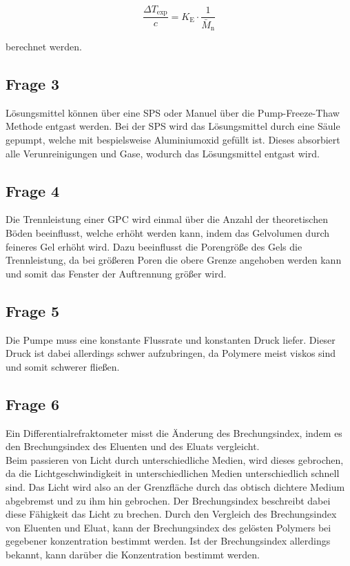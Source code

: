 \documentclass[10pt,a4paper,ngerman]{scrartcl}
\begin{document}
		\begin{equation}
			\frac{\Delta T_\text{exp}}{c} = K_\text{E} \cdot \frac{1}{\bar{M}_\text{n}}
		\end{equation}

		berechnet werden. \cite{Ludwigs2025}
	\subsection{Frage 3}

		Lösungsmittel können über eine SPS oder Manuel über die Pump-Freeze-Thaw Methode entgast werden. Bei der SPS wird das 
		Lösungsmittel durch eine Säule gepumpt, welche mit bespielsweise Aluminiumoxid gefüllt ist. Dieses absorbiert alle Verunreinigungen und 
		Gase, wodurch das Lösungsmittel entgast wird. 

	\subsection{Frage 4}

		Die Trennleistung einer GPC wird einmal über die Anzahl der theoretischen Böden beeinflusst, welche erhöht werden kann, indem das 
		Gelvolumen durch feineres Gel erhöht wird. Dazu beeinflusst die Porengröße des Gels die Trennleistung, da bei größeren Poren die obere 
		Grenze angehoben werden kann und somit das Fenster der Auftrennung größer wird. \cite{polyskript}

	\subsection{Frage 5}

		Die Pumpe muss eine konstante Flussrate und konstanten Druck liefer. Dieser Druck ist dabei allerdings schwer aufzubringen, da Polymere 
		meist viskos sind und somit schwerer fließen. \cite{polyskript}

	\subsection{Frage 6}

		Ein Differentialrefraktometer misst die Änderung des Brechungsindex, indem es den Brechungsindex des Eluenten und des Eluats vergleicht. \\
		Beim passieren von Licht durch unterschiedliche Medien, wird dieses gebrochen, da die Lichtgeschwindigkeit in unterschiedlichen Medien 
		unterschiedlich schnell sind. Das Licht wird also an der Grenzfläche durch das obtisch dichtere Medium abgebremst und zu ihm hin gebrochen. 
		Der Brechungsindex beschreibt dabei diese Fähigkeit das Licht zu brechen. Durch den Vergleich des Brechungsindex von Eluenten und Eluat, 
		kann der Brechungsindex des gelösten Polymers bei gegebener konzentration bestimmt werden. Ist der Brechungsindex allerdings bekannt, kann 
		darüber die Konzentration bestimmt werden. \cite{noauthor_refraktometer_2023}



\printbibliography
\end{document}
